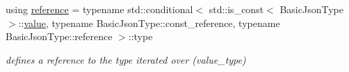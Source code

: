 \begin{DoxyCompactItemize}
\mbox{\label{classnlohmann_1_1detail_1_1iter__impl_a5be8001be099c6b82310f4d387b953ce}} 
using \mbox{\hyperlink{classnlohmann_1_1detail_1_1iter__impl_a5be8001be099c6b82310f4d387b953ce}{reference}} = typename std\+::conditional$<$ std\+::is\+\_\+const$<$ Basic\+Json\+Type $>$\+::\mbox{\hyperlink{classnlohmann_1_1detail_1_1iter__impl_ab447c50354c6611fa2ae0100ac17845c}{value}}, typename Basic\+Json\+Type\+::const\+\_\+reference, typename Basic\+Json\+Type\+::reference $>$\+::type
\begin{DoxyCompactList}\small\item\em defines a reference to the type iterated over (value\+\_\+type) \end{DoxyCompactList}\end{DoxyCompactItemize}
